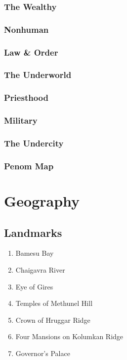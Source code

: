 \subsubsection{The Wealthy}

\subsubsection{Nonhuman}

\subsubsection{Law \& Order}

\subsubsection{The Underworld}

\subsubsection{Priesthood}

\subsubsection{Military}

\subsubsection{The Undercity}

\subsubsection{Penom Map}

\section{Geography}

\subsection{Landmarks}


\begin{enumerate}
\item Bamesu Bay
\item Chaigavra River
\item Eye of Gires
\item Temples of Methunel Hill
\item Crown of Hruggar Ridge
\item Four Mansions on Kolumkan Ridge
\item Governor's Palace
\end{enumerate}

